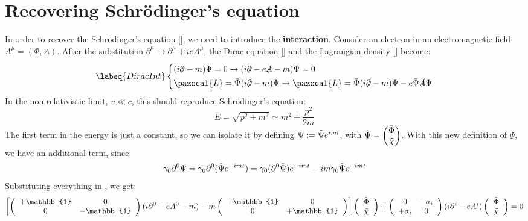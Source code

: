 \documentclass[../main.tex]{subfiles}
\begin{document}
\section{Recovering Schr\"odinger's equation}
In order to recover the Schr\"odinger's equation [], we need to introduce the \textbf{interaction}. Consider an electron in an electromagnetic field $A^\mu=(\Phi,\underline{A})$. After the substitution $\partial^\mu\xrightarrow[]{}\partial^\mu+ieA^\mu$, the Dirac equation [] and the Lagrangian density [] become:
\begin{equation}
\labeq{DiracInt}
\left\{
\begin{aligned}
&(i\slashed{\partial}-m)\Psi=0\xrightarrow[]{}(i\slashed{\partial}-e\slashed{A}-m)\Psi=0\\
&\pazocal{L}=\bar{\Psi}(i\slashed{\partial}-m)\Psi\xrightarrow[]{}\pazocal{L}=\bar{\Psi}(i\slashed{\partial}-m)\Psi-e\bar{\Psi}\slashed{A}\Psi
\end{aligned}
\right.
\end{equation}
In the non relativistic limit, $v\ll c$, this should reproduce Schr\"odinger's equation:
\[
E=\sqrt{p^2+m^2}\simeq m^2+\frac{p^2}{2m}
\]
The first term in the energy is just a constant, so we can isolate it by defining $\Psi:=\Tilde{\Psi}e^{imt}$, with $\Tilde{\Psi}=\begin{pmatrix}
\Tilde{\Phi}\\
\Tilde{\chi}
\end{pmatrix}$. With this new definition of $\Psi$, we have an additional term, since:
\[
\gamma_0\partial^0\Psi=\gamma_0\partial^0(\Tilde{\Psi}e^{-imt})=\gamma_0(\partial^0\Tilde{\Psi})e^{-imt}-im\gamma_0\Tilde{\Psi}e^{-imt}
\]
Substituting everything in , we get:
\[
\left[\left(\begin{array}{cc}
    +\mathbb{1} & 0 \\
    0 & -\mathbb{1}
\end{array}\right)(i\partial^0-eA^0+m)-m\left(\begin{array}{cc}
    +\mathbb{1} & 0 \\
    0 & +\mathbb{1}
\end{array}\right)\right]\left(\begin{array}{c}
    \Tilde{\Phi} \\
    \Tilde{\chi}
\end{array}\right)+\left(\begin{array}{cc}
    0 & -\sigma_i \\
    +\sigma_i & 0
\end{array}\right)(i\partial^i-eA^i)\left(\begin{array}{c}
    \Tilde{\Phi} \\
    \Tilde{\chi}
\end{array}\right)=0
\]
\end{document}
